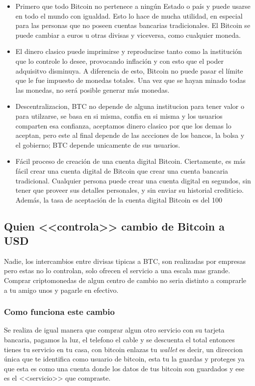 \documentclass[12pt,letterpaper]{article}
\begin{document}
    \begin{itemize}
	    \item Primero que todo Bitcoin no pertenece a ning\'un Estado o pa\'is y puede usarse en todo el mundo con igualdad. Esto lo hace de mucha utilidad, en especial para las personas que no poseen cuentas bancarias tradicionales. El Bitcoin se puede cambiar a euros u otras divisas y viceversa, como cualquier moneda. 
	
        \item El dinero clasico puede imprimirse y reproducirse tanto como la instituci\'on que lo controle lo desee, provocando inflaci\'on y con esto que el poder adquisitvo disminuya. A diferencia de esto, Bitcoin no puede pasar el l\'imite que le fue impuesto de monedas totales. Una vez que se hayan minado todas las monedas, no ser\'a posible generar m\'as monedas.
	
	    \item Descentralizacion, BTC no depende de alguna institucion para tener valor o para utilzarse, se basa en si misma, confia en si misma y los usuarios comparten esa confianza, aceptamos dinero clasico por que los demas lo aceptan, pero este al final depende de las accciones de los bancos, la bolsa y el gobierno; BTC depende unicamente de sus usuarios.
	
	    \item F\'acil proceso de creaci\'on de una cuenta digital Bitcoin. Ciertamente, es m\'as f\'acil crear una cuenta digital de Bitcoin que crear una cuenta bancaria tradicional. Cualquier persona puede crear una cuenta digital en segundos, sin tener que proveer sus detalles personales, y sin enviar su historial crediticio. Adem\'as, la tasa de aceptaci\'on de la cuenta digital Bitcoin es del 100%
    
    \end{itemize}
	
	\subsection*{Quien <<controla>> cambio de Bitcoin a USD}
	Nadie, los intercambios entre divisas tipicas a BTC, son realizadas por empresas pero estas no lo controlan, solo ofrecen el servicio a una escala mas grande. Comprar criptomonedas de algun centro de cambio no seria distinto a comprarle a tu amigo unos y pagarle en efectivo.

		\subsubsection*{Como funciona este cambio}
        Se realiza de igual manera que comprar algun otro servicio con su tarjeta bancaria, pagamos la luz, el telefono el cable y se descuenta el total entonces tienes tu servicio en tu casa, con bitcoin enlazas tu \textit{wallet} es decir, un direccion \'unica que te identifica como usuario de bitcoin, esta tu la guardas y proteges ya que esta es como una cuenta donde los datos de tus bitcoin son guardados y ese es el <<servicio>> que compraste.
\end{document}
